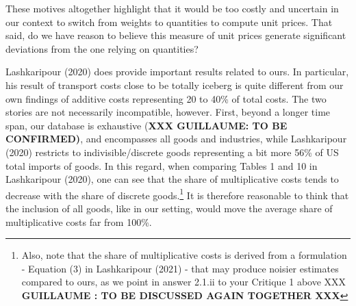\documentclass[a4paper,12pt]{article}
\begin{document}
These motives altogether highlight that it would be too costly and uncertain in our context to switch from weights to quantities to compute unit prices. That said, do we have reason to believe this measure of unit prices generate significant deviations from the one relying on quantities? 

Lashkaripour (2020) does provide important results related to ours. In particular, his result of transport costs close to be totally iceberg is quite different from our own findings of additive costs representing 20 to 40\% of total costs. The two stories are not necessarily incompatible, however. First, beyond a longer time span, our database is exhaustive (\textbf{XXX GUILLAUME: TO BE CONFIRMED)}, and encompasses all goods and industries, while Lashkaripour (2020) restricts to indivisible/discrete goods representing a bit more 56\% of US total imports of goods. In this regard, when comparing Tables 1 and 10 in Lashkaripour (2020), one can see that the share of multiplicative costs tends to decrease with the share of discrete goods.\footnote{Also, note that the share of multiplicative costs is derived from a formulation - Equation (3) in Lashkaripour (2021) - that may produce noisier estimates compared to ours, as we point in answer 2.1.ii to your Critique 1 above XXX \textbf{GUILLAUME : TO BE DISCUSSED AGAIN TOGETHER XXX}} It is therefore reasonable to think that the inclusion of all goods, like in our setting, would move the average share of multiplicative costs far from 100\%.





\end{document}
